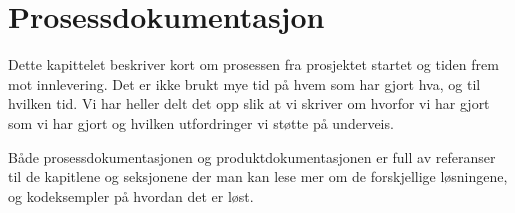\chapter{Prosessdokumentasjon}
Dette kapittelet beskriver kort om prosessen fra prosjektet startet og tiden frem mot innlevering. Det er ikke brukt mye tid på hvem som har gjort hva, og til hvilken tid. Vi har heller delt det opp slik at vi skriver om hvorfor vi har gjort som vi har gjort og hvilken utfordringer vi støtte på underveis. 



Både prosessdokumentasjonen og produktdokumentasjonen er full av referanser til de kapitlene og seksjonene der man kan lese mer om de forskjellige løsningene, og kodeksempler på hvordan det er løst.






